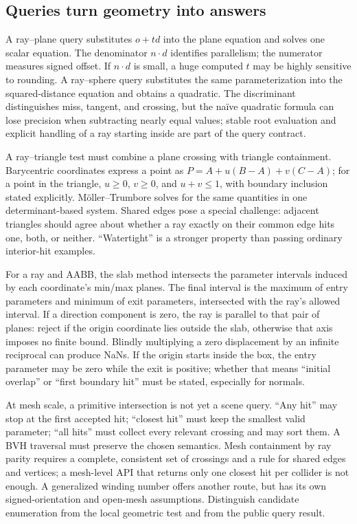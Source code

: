 \subsection{Queries turn geometry into answers}\label{03-visual-computing-i-ch020-queries-turn-geometry-into-answers}

\hypertarget{03-visual-computing-i-ch020-queries-turn-geometry-into-answers}{}

A ray--plane query substitutes \(o+td\) into the plane equation and solves one scalar equation. The denominator \(n\cdot d\) identifies parallelism; the numerator measures signed offset. If \(n\cdot d\) is small, a huge computed \(t\) may be highly sensitive to rounding. A ray--sphere query substitutes the same parameterization into the squared-distance equation and obtains a quadratic. The discriminant distinguishes miss, tangent, and crossing, but the naïve quadratic formula can lose precision when subtracting nearly equal values; stable root evaluation and explicit handling of a ray starting inside are part of the query contract.

A ray--triangle test must combine a plane crossing with triangle containment. Barycentric coordinates express a point as \(P=A+u(B-A)+v(C-A)\); for a point in the triangle, \(u\ge0\), \(v\ge0\), and \(u+v\le1\), with boundary inclusion stated explicitly. Möller--Trumbore solves for the same quantities in one determinant-based system. Shared edges pose a special challenge: adjacent triangles should agree about whether a ray exactly on their common edge hits one, both, or neither. ``Watertight'' is a stronger property than passing ordinary interior-hit examples.

For a ray and AABB, the slab method intersects the parameter intervals induced by each coordinate's min/max planes. The final interval is the maximum of entry parameters and minimum of exit parameters, intersected with the ray's allowed interval. If a direction component is zero, the ray is parallel to that pair of planes: reject if the origin coordinate lies outside the slab, otherwise that axis imposes no finite bound. Blindly multiplying a zero displacement by an infinite reciprocal can produce NaNs. If the origin starts inside the box, the entry parameter may be zero while the exit is positive; whether that means ``initial overlap'' or ``first boundary hit'' must be stated, especially for normals.

At mesh scale, a primitive intersection is not yet a scene query. ``Any hit'' may stop at the first accepted hit; ``closest hit'' must keep the smallest valid parameter; ``all hits'' must collect every relevant crossing and may sort them. A BVH traversal must preserve the chosen semantics. Mesh containment by ray parity requires a complete, consistent set of crossings and a rule for shared edges and vertices; a mesh-level API that returns only one closest hit per collider is not enough. A generalized winding number offers another route, but has its own signed-orientation and open-mesh assumptions. Distinguish candidate enumeration from the local geometric test and from the public query result.

